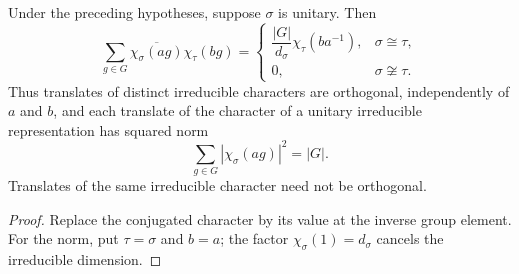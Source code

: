 \begin{lemma}
    \label{thm:peps_translated_character_inner_product}
    \leanok
    Under the preceding hypotheses, suppose $\sigma$ is unitary. Then
    \[
        \sum_{g\in G}\overline{\chi_\sigma(ag)}\chi_\tau(bg)
        =\begin{cases}
            \dfrac{|G|}{d_\sigma}\chi_\tau(ba^{-1}), & \sigma\cong\tau,     \\
            0,                                       & \sigma\not\cong\tau.
        \end{cases}
    \]
    Thus translates of distinct irreducible characters are orthogonal,
    independently of $a$ and $b$, and each translate of the character of a
    unitary irreducible representation has squared norm
    \[
        \sum_{g\in G}|\chi_\sigma(ag)|^2=|G|.
    \]
    Translates of the same irreducible character need not be orthogonal.
\end{lemma}

\begin{proof}\leanok
    Replace the conjugated character by its value at the inverse group
    element. For the norm, put $\tau=\sigma$ and $b=a$; the factor
    $\chi_\sigma(1)=d_\sigma$ cancels the irreducible dimension.
\end{proof}
